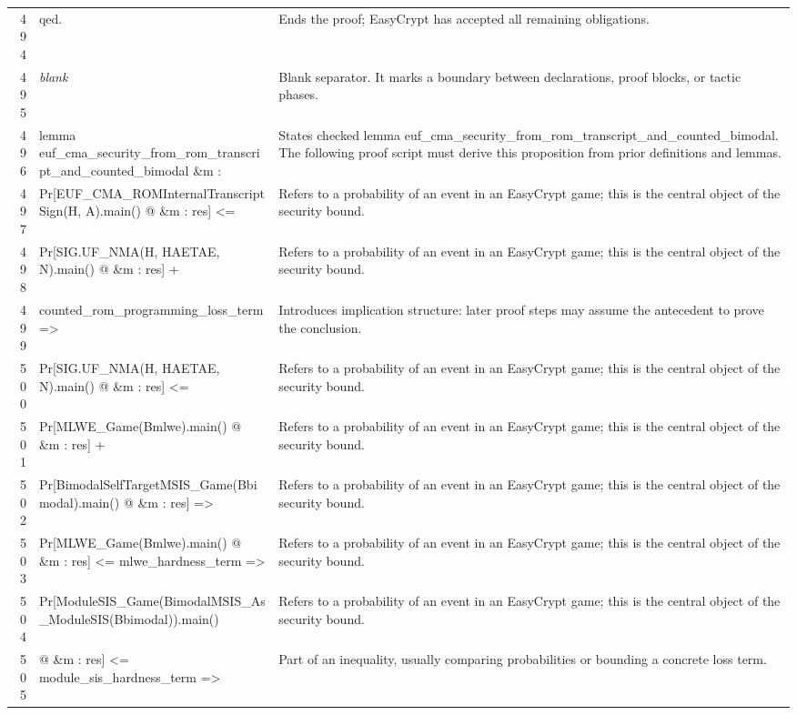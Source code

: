 \documentclass[10pt]{article}
\begin{document}
\begin{longtable}{r L{0.53\textwidth} L{0.37\textwidth}}
494 & {\ttfamily\scriptsize qed.} & Ends the proof; EasyCrypt has accepted all remaining obligations. \\
495 & {\ttfamily\scriptsize \emph{blank}} & Blank separator.  It marks a boundary between declarations, proof blocks, or tactic phases. \\
496 & {\ttfamily\scriptsize lemma euf\_cma\_security\_from\_rom\_transcript\_and\_counted\_bimodal \&m :} & States checked lemma euf\_cma\_security\_from\_rom\_transcript\_and\_counted\_bimodal.  The following proof script must derive this proposition from prior definitions and lemmas. \\
497 & {\ttfamily\scriptsize   Pr[EUF\_CMA\_ROMInternalTranscriptSign(H, A).main() @ \&m : res] <=} & Refers to a probability of an event in an EasyCrypt game; this is the central object of the security bound. \\
498 & {\ttfamily\scriptsize     Pr[SIG.UF\_NMA(H, HAETAE, N).main() @ \&m : res] +} & Refers to a probability of an event in an EasyCrypt game; this is the central object of the security bound. \\
499 & {\ttfamily\scriptsize     counted\_rom\_programming\_loss\_term =>} & Introduces implication structure: later proof steps may assume the antecedent to prove the conclusion. \\
500 & {\ttfamily\scriptsize   Pr[SIG.UF\_NMA(H, HAETAE, N).main() @ \&m : res] <=} & Refers to a probability of an event in an EasyCrypt game; this is the central object of the security bound. \\
501 & {\ttfamily\scriptsize     Pr[MLWE\_Game(Bmlwe).main() @ \&m : res] +} & Refers to a probability of an event in an EasyCrypt game; this is the central object of the security bound. \\
502 & {\ttfamily\scriptsize     Pr[BimodalSelfTargetMSIS\_Game(Bbimodal).main() @ \&m : res] =>} & Refers to a probability of an event in an EasyCrypt game; this is the central object of the security bound. \\
503 & {\ttfamily\scriptsize   Pr[MLWE\_Game(Bmlwe).main() @ \&m : res] <= mlwe\_hardness\_term =>} & Refers to a probability of an event in an EasyCrypt game; this is the central object of the security bound. \\
504 & {\ttfamily\scriptsize   Pr[ModuleSIS\_Game(BimodalMSIS\_As\_ModuleSIS(Bbimodal)).main()} & Refers to a probability of an event in an EasyCrypt game; this is the central object of the security bound. \\
505 & {\ttfamily\scriptsize        @ \&m : res] <= module\_sis\_hardness\_term =>} & Part of an inequality, usually comparing probabilities or bounding a concrete loss term. \\

\end{longtable}
\end{document}
